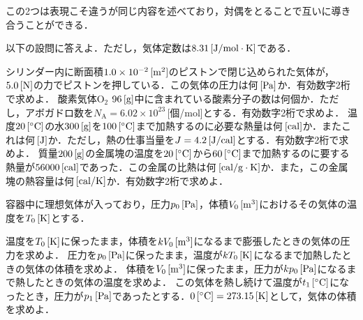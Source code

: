 この2つは表現こそ違うが同じ内容を述べており，対偶をとることで互いに導き合うことができる．

\newpage

\setcounter{qno}{0}



\hspace{1zw}以下の設問に答えよ．ただし，気体定数は$8.31\,[\mathrm{J/mol\cdot K}]$である．
\begin{komon}
 シリンダー内に断面積$1.0\times 10^{-2}\,[\mathrm{m^2}]$のピストンで閉じ込められた気体が，$5.0\,[\mathrm{N}]$の力でピストンを押している．この気体の圧力は何$\,[\mathrm{Pa}]$か．有効数字2桁で求めよ．
 酸素気体$\mathrm{O_2}$ $96\,[\mathrm{g}]$中に含まれている酸素分子の数は何個か．ただし，アボガドロ数を$N_{\mathrm{A}}=6.02\times 10^{23}$\,[個/mol]とする．有効数字2桁で求めよ．
 温度$20\,[{}^\circ\mathrm{C}]$の水$300\,[\mathrm{g}]$を$100\,[{}^\circ\mathrm{C}]$まで加熱するのに必要な熱量は何$\,[\mathrm{cal}]$か．またこれは何$\,[\mathrm{J}]$か．ただし，熱の仕事当量を$J=4.2\,[\mathrm{J/cal}]$とする．有効数字2桁で求めよ．
 質量$200\,[\mathrm{g}]$の金属塊の温度を$20\,[{}^\circ\mathrm{C}]$から$60\,[{}^\circ\mathrm{C}]$まで加熱するのに要する熱量が$56000\,[\mathrm{cal}]$であった．この金属の比熱は何$\,[\mathrm{cal/g\cdot K}]$か．また，この金属塊の熱容量は何$\,[\mathrm{cal/K}]$か．有効数字2桁で求めよ．
\end{komon}



\hspace{1zw}容器中に理想気体が入っており，圧力$p_0\,[\mathrm{Pa}]$，体積$V_0\,[\mathrm{m^3}]$におけるその気体の温度を$T_0\,[\mathrm{K}]$とする．
\begin{komon}
 温度を$T_0\,[\mathrm{K}]$に保ったまま，体積を$kV_0\,[\mathrm{m^3}]$になるまで膨張したときの気体の圧力を求めよ．
 圧力を$p_0\,[\mathrm{Pa}]$に保ったまま，温度が$kT_0\,[\mathrm{K}]$になるまで加熱したときの気体の体積を求めよ．
 体積を$V_0\,[\mathrm{m^3}]$に保ったまま，圧力が$kp_0\,[\mathrm{Pa}]$になるまで熱したときの気体の温度を求めよ．
 この気体を熱し続けて温度が$t_1\,[{}^\circ\mathrm{C}]$になったとき，圧力が$p_1\,[\mathrm{Pa}]$であったとする．$0\,[{}^\circ\mathrm{C}]=273.15\,[\mathrm{K}]$として，気体の体積を求めよ．
\end{komon}



